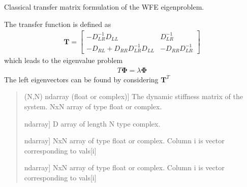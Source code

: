 \documentclass[letterpaper,10pt,english]{sphinxmanual}
\begin{document}
\begin{fulllineitems}
\label{\detokenize{core:pywfe.core.eigensolvers.transfer_matrix}}
\pysigstartsignatures
{}
\pysigstopsignatures
\sphinxAtStartPar
Classical transfer matrix formulation of the WFE eigenproblem.

\sphinxAtStartPar
The transfer function is defined as
\begin{equation*}
\begin{split}\mathbf{T} = \begin{bmatrix}
-D_{LR}^{-1} D_{LL} & D_{LR}^{-1} \\
-D_{RL}+D_{RR} D_{LR}^{-1} D_{LL} & -D_{RR} D_{LR}^{-1}
\end{bmatrix}\end{split}
\end{equation*}
\sphinxAtStartPar
which leads to the eigenvalue problem
\begin{equation*}
\begin{split}T \mathbf{\Phi} = \lambda \mathbf{\Phi}\end{split}
\end{equation*}
\sphinxAtStartPar
The left eigenvectors can be found by considering \(\mathbf{T}^{T}\)
\begin{quote}\begin{description}
\begin{description}
\sphinxlineitem{\sphinxstylestrong{DSM}}{[}(N,N) ndarray (float or complex){]}
\sphinxAtStartPar
The dynamic stiffness matrix of the system. 
NxN array of type float or complex.

\end{description}

\begin{description}
\sphinxlineitem{\sphinxstylestrong{vals}}{[}ndarray{]}
\sphinxhyphen{}D array of length N type complex.

\sphinxlineitem{\sphinxstylestrong{left\_eigenvectors}}{[}ndarray{]}
\sphinxAtStartPar
NxN array of type float or complex.
Column i is vector corresponding to vals{[}i{]}

\sphinxlineitem{\sphinxstylestrong{right\_eigenvectors}}{[}ndarray{]}
\sphinxAtStartPar
NxN array of type float or complex.
Column i is vector corresponding to vals{[}i{]}

\end{description}

\end{description}\end{quote}

\end{fulllineitems}
\end{document}
